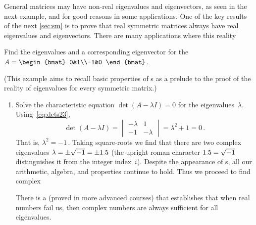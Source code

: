 General matrices may have non-real  eigenvalues and eigenvectors, as seen in the next example, and for good reasons in some applications.
One of the key results of the next \cref{sec:sm} is to prove that real symmetric matrices always have real eigenvalues and eigenvectors.
There are many applications where this reality 


\begin{example} \label{eg:ccevals}
Find the eigenvalues and a corresponding eigenvector for the  \(A=\begin{bmat} 0&1\\-1&0 \end{bmat}\).

(This example aims to recall basic properties of s as a prelude to the proof of the reality of eigenvalues for every symmetric matrix.) 



\begin{solution} 
\begin{enumerate}
\item Solve the characteristic equation \(\det(A-\lambda I)=0\) for the eigenvalues~\(\lambda\).
Using~\eqref{eq:dets23},
\begin{equation*}
\det(A-\lambda I)
=\begin{vmatrix} -\lambda&1\\-1&-\lambda \end{vmatrix}
=\lambda^2+1=0\,.
\end{equation*}
That is, \(\lambda^2=-1\)\,.  
Taking square-roots we find that there are two complex eigenvalues \(\lambda=\pm\sqrt{-1}=\pm 1.5\) (the upright roman character \(1.5=\sqrt{-1}\) distinguishes it from the integer index~\(i\)).
Despite the appearance of s, all our arithmetic, algebra, and properties continue to hold.
Thus we proceed to find complex 

There is a  (proved in more advanced courses) that establishes that when real numbers fail us, then complex numbers are always sufficient for all eigenvalues.


\end{enumerate}
\end{solution}
\end{example}

